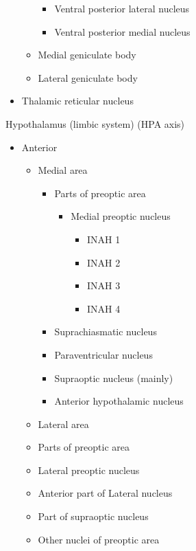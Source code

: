\begin{itemize}
\begin{itemize}
    \begin{itemize}
    \tightlist
    \item
      Ventral posterior lateral nucleus
    \item
      Ventral posterior medial nucleus
    \end{itemize}
  \item
    Medial geniculate body
  \item
    Lateral geniculate body
  \end{itemize}
\item
  Thalamic reticular nucleus
\end{itemize}

Hypothalamus (limbic system) (HPA axis)

\begin{itemize}
\tightlist
\item
  Anterior

  \begin{itemize}
  \tightlist
  \item
    Medial area

    \begin{itemize}
    \tightlist
    \item
      Parts of preoptic area

      \begin{itemize}
      \tightlist
      \item
        Medial preoptic nucleus

        \begin{itemize}
        \tightlist
        \item
          INAH 1
        \item
          INAH 2
        \item
          INAH 3
        \item
          INAH 4
        \end{itemize}
      \end{itemize}
    \item
      Suprachiasmatic nucleus
    \item
      Paraventricular nucleus
    \item
      Supraoptic nucleus (mainly)
    \item
      Anterior hypothalamic nucleus
    \end{itemize}
  \item
    Lateral area
  \item
    Parts of preoptic area
  \item
    Lateral preoptic nucleus
  \item
    Anterior part of Lateral nucleus
  \item
    Part of supraoptic nucleus
  \item
    Other nuclei of preoptic area


\end{itemize}
\end{itemize}
